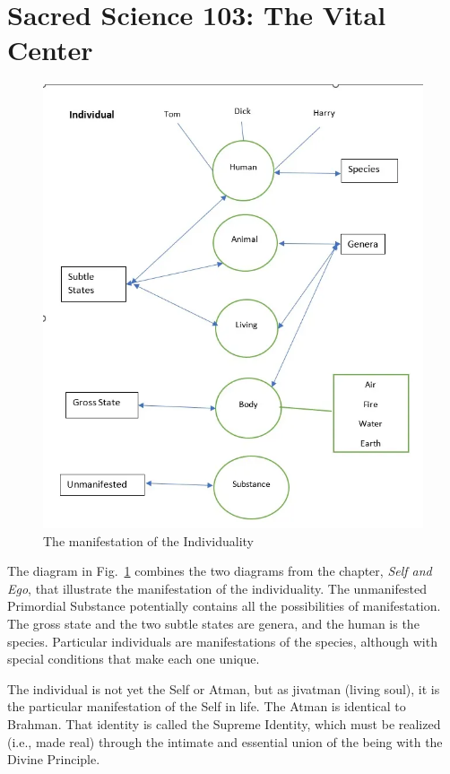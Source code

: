\section{Sacred Science 103: The Vital Center}

\begin{figure}[t]
\centering
\includegraphics[scale=0.25]{a20220928SacredScience103TheVitalCenter-img001.png}
\caption{The manifestation of the Individuality}
\label{fig:SacredScience103_1}
\end{figure}
 
The diagram in Fig.~\ref{fig:SacredScience103_1} combines the two diagrams from the chapter, \emph{Self and Ego}, that illustrate the manifestation of the individuality. The unmanifested Primordial Substance potentially contains all the possibilities of manifestation. The gross state and the two subtle states are genera, and the human is the species. Particular individuals are manifestations of the species, although with special conditions that make each one unique.

The individual is not yet the Self or Atman, but as jivatman (living soul), it is the particular manifestation of the Self in life. The Atman is identical to Brahman. That identity is called the Supreme Identity, which must be realized (i.e., made real) through the intimate and essential union of the being with the Divine Principle.

